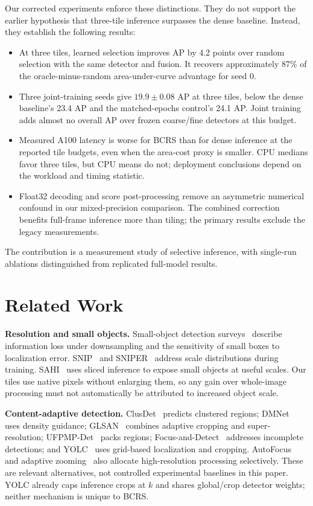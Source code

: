\documentclass[conference]{IEEEtran}
\begin{document}
Our corrected experiments enforce these distinctions. They do not support the earlier hypothesis that three-tile inference surpasses the dense baseline. Instead, they establish the following results:
\begin{itemize}
\item At three tiles, learned selection improves AP by 4.2 points over random selection with the same detector and fusion. It recovers approximately 87\% of the oracle-minus-random area-under-curve advantage for seed 0.
\item Three joint-training seeds give $19.9\pm0.08$ AP at three tiles, below the dense baseline's 23.4 AP and the matched-epochs control's 24.1 AP. Joint training adds almost no overall AP over frozen coarse/fine detectors at this budget.
\item Measured A100 latency is worse for BCRS than for dense inference at the reported tile budgets, even when the area-cost proxy is smaller. CPU medians favor three tiles, but CPU means do not; deployment conclusions depend on the workload and timing statistic.
\item Float32 decoding and score post-processing remove an asymmetric numerical confound in our mixed-precision comparison. The combined correction benefits full-frame inference more than tiling; the primary results exclude the legacy measurements.
\end{itemize}
The contribution is a measurement study of selective inference, with single-run ablations distinguished from replicated full-model results.

\section{Related Work}
\textbf{Resolution and small objects.} Small-object detection surveys~\cite{cheng2023sodsurvey} describe information loss under downsampling and the sensitivity of small boxes to localization error. SNIP~\cite{singh2018snip} and SNIPER~\cite{singh2018sniper} address scale distributions during training. SAHI~\cite{akyon2022sahi} uses sliced inference to expose small objects at useful scales. Our tiles use native pixels without enlarging them, so any gain over whole-image processing must not automatically be attributed to increased object scale.

\textbf{Content-adaptive detection.} ClusDet~\cite{yang2019clusdet} predicts clustered regions; DMNet~\cite{li2020dmnet} uses density guidance; GLSAN~\cite{deng2021glsan} combines adaptive cropping and super-resolution; UFPMP-Det~\cite{huang2022ufpmp} packs regions; Focus-and-Detect~\cite{koyun2022focusdetect} addresses incomplete detections; and YOLC~\cite{liu2024yolc} uses grid-based localization and cropping. AutoFocus~\cite{najibi2019autofocus} and adaptive zooming~\cite{gao2018dynamiczoom,xu2021adazoom} also allocate high-resolution processing selectively. These are relevant alternatives, not controlled experimental baselines in this paper. YOLC already caps inference crops at $k$ and shares global/crop detector weights; neither mechanism is unique to BCRS.
\end{document}
